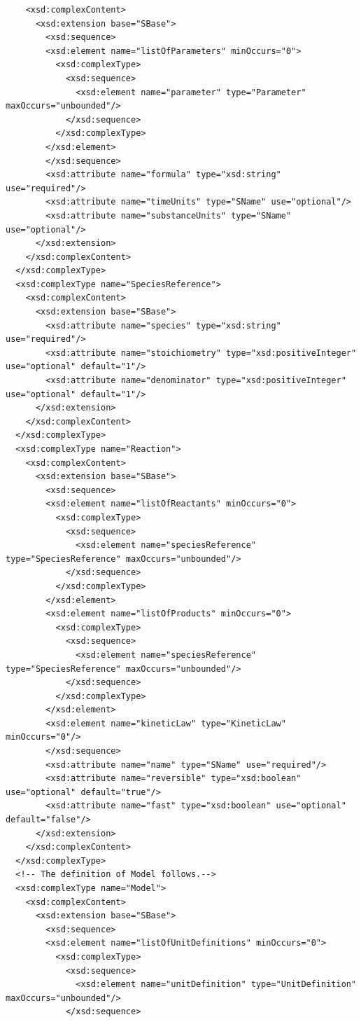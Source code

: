 \documentclass[10pt]{cekarticle}
\begin{document}
\begin{small}
\begin{verbatim}
    <xsd:complexContent>
      <xsd:extension base="SBase">
      	<xsd:sequence>
        <xsd:element name="listOfParameters" minOccurs="0">
          <xsd:complexType>
            <xsd:sequence>
              <xsd:element name="parameter" type="Parameter" maxOccurs="unbounded"/>
            </xsd:sequence>
          </xsd:complexType>
        </xsd:element>
      	</xsd:sequence>
      	<xsd:attribute name="formula" type="xsd:string" use="required"/>
      	<xsd:attribute name="timeUnits" type="SName" use="optional"/>
      	<xsd:attribute name="substanceUnits" type="SName" use="optional"/>
      </xsd:extension>
    </xsd:complexContent>
  </xsd:complexType>
  <xsd:complexType name="SpeciesReference">
    <xsd:complexContent>
      <xsd:extension base="SBase">
      	<xsd:attribute name="species" type="xsd:string" use="required"/>
      	<xsd:attribute name="stoichiometry" type="xsd:positiveInteger" use="optional" default="1"/>
      	<xsd:attribute name="denominator" type="xsd:positiveInteger" use="optional" default="1"/>
      </xsd:extension>
    </xsd:complexContent>
  </xsd:complexType>
  <xsd:complexType name="Reaction">
    <xsd:complexContent>
      <xsd:extension base="SBase">
      	<xsd:sequence>
        <xsd:element name="listOfReactants" minOccurs="0">
          <xsd:complexType>
            <xsd:sequence>
              <xsd:element name="speciesReference" type="SpeciesReference" maxOccurs="unbounded"/>
            </xsd:sequence>
          </xsd:complexType>
        </xsd:element>
        <xsd:element name="listOfProducts" minOccurs="0">
          <xsd:complexType>
            <xsd:sequence>
              <xsd:element name="speciesReference" type="SpeciesReference" maxOccurs="unbounded"/>
            </xsd:sequence>
          </xsd:complexType>
        </xsd:element>
        <xsd:element name="kineticLaw" type="KineticLaw" minOccurs="0"/>
      	</xsd:sequence>
      	<xsd:attribute name="name" type="SName" use="required"/>
      	<xsd:attribute name="reversible" type="xsd:boolean" use="optional" default="true"/>
      	<xsd:attribute name="fast" type="xsd:boolean" use="optional" default="false"/>
      </xsd:extension>
    </xsd:complexContent>
  </xsd:complexType>
  <!-- The definition of Model follows.-->
  <xsd:complexType name="Model">
    <xsd:complexContent>
      <xsd:extension base="SBase">
      	<xsd:sequence>
        <xsd:element name="listOfUnitDefinitions" minOccurs="0">
          <xsd:complexType>
            <xsd:sequence>
              <xsd:element name="unitDefinition" type="UnitDefinition" maxOccurs="unbounded"/>
            </xsd:sequence>

\end{verbatim}
\end{small}
\end{document}
